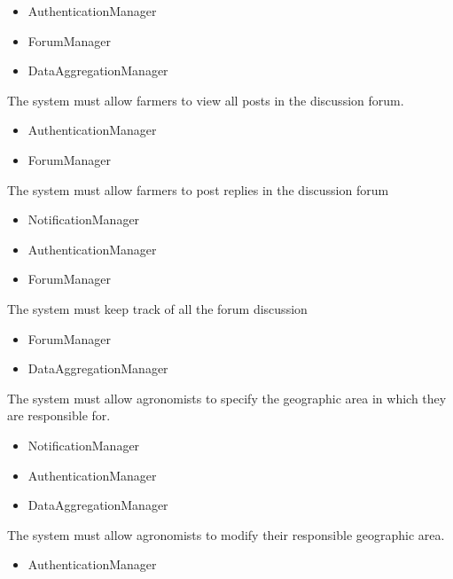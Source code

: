 \begin{itemize}
\begin{itemize}

\item AuthenticationManager
\item ForumManager
\item DataAggregationManager


\end{itemize}

  The system must allow farmers to view all posts in the discussion forum.
\begin{itemize}

\item AuthenticationManager
\item ForumManager


\end{itemize}
  The system must allow farmers to post replies in the discussion forum
\begin{itemize}

\item NotificationManager
\item AuthenticationManager
\item ForumManager

\end{itemize}

  The system must keep track of all the forum discussion
\begin{itemize}


\item ForumManager
\item DataAggregationManager

\end{itemize}

 The system must allow agronomists to specify the geographic area in which they are responsible for.
\begin{itemize}

\item NotificationManager
\item AuthenticationManager
\item DataAggregationManager

\end{itemize}

 The system must allow agronomists to modify their responsible geographic area.
\begin{itemize}


\item AuthenticationManager



\end{itemize}
\end{itemize}

